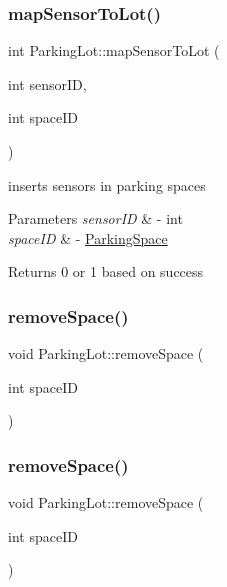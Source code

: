 \subsubsection{\texorpdfstring{map\+Sensor\+To\+Lot()}{mapSensorToLot()}\hspace{0.1cm}{\footnotesize\ttfamily [2/2]}}
{\footnotesize\ttfamily int Parking\+Lot\+::map\+Sensor\+To\+Lot (\begin{DoxyParamCaption}\item[{int}]{sensor\+ID,  }\item[{int}]{space\+ID }\end{DoxyParamCaption})}



inserts sensors in parking spaces 


\begin{DoxyParams}{Parameters}
{\em sensor\+ID} & -\/ int \\
\hline
{\em space\+ID} & -\/ \mbox{\hyperlink{class_parking_space}{Parking\+Space}} \\
\hline
\end{DoxyParams}
\begin{DoxyReturn}{Returns}
0 or 1 based on success 
\end{DoxyReturn}
\mbox{\label{class_parking_lot_a2ff1620a479383eb08ffa33474c41c22}} 
\subsubsection{\texorpdfstring{remove\+Space()}{removeSpace()}\hspace{0.1cm}{\footnotesize\ttfamily [1/2]}}
{\footnotesize\ttfamily void Parking\+Lot\+::remove\+Space (\begin{DoxyParamCaption}\item[{int}]{space\+ID }\end{DoxyParamCaption})}

\mbox{\label{class_parking_lot_a2ff1620a479383eb08ffa33474c41c22}} 
\subsubsection{\texorpdfstring{remove\+Space()}{removeSpace()}\hspace{0.1cm}{\footnotesize\ttfamily [2/2]}}
{\footnotesize\ttfamily void Parking\+Lot\+::remove\+Space (\begin{DoxyParamCaption}\item[{int}]{space\+ID }\end{DoxyParamCaption})}



